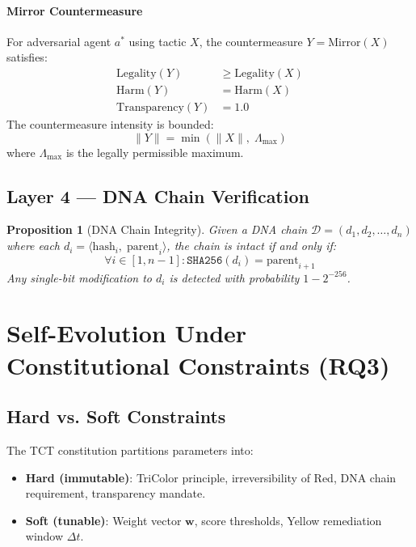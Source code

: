 \documentclass[conference]{IEEEtran}
\newtheorem{proposition}{Proposition}
\begin{document}
\paragraph{Mirror Countermeasure}
For adversarial agent $a^*$ using tactic $X$, the countermeasure
$Y = \text{Mirror}(X)$ satisfies:
\begin{align}
  \text{Legality}(Y) &\geq \text{Legality}(X) \label{eq:mirror_legal}\\
  \text{Harm}(Y) &= \text{Harm}(X) \label{eq:mirror_harm}\\
  \text{Transparency}(Y) &= 1.0 \label{eq:mirror_transparent}
\end{align}
The countermeasure intensity is bounded:
\begin{equation}
  \|Y\| = \min\!\left(\|X\|,\; \Lambda_{\max}\right)
  \label{eq:mirror_bound}
\end{equation}
where $\Lambda_{\max}$ is the legally permissible maximum.

\subsection{Layer 4 — DNA Chain Verification}

\begin{proposition}[DNA Chain Integrity]
Given a DNA chain $\mathcal{D} = (d_1, d_2, \ldots, d_n)$ where
each $d_i = \langle \text{hash}_i,\; \text{parent}_i \rangle$, the
chain is \emph{intact} if and only if:
\begin{equation}
  \forall i \in [1,n{-}1]: \texttt{SHA256}(d_i) = \text{parent}_{i+1}
\end{equation}
Any single-bit modification to $d_i$ is detected with probability
$1 - 2^{-256}$.
\end{proposition}

\section{Self-Evolution Under Constitutional Constraints (RQ3)}
\label{sec:evolution}

\subsection{Hard vs. Soft Constraints}

The TCT constitution partitions parameters into:
\begin{itemize}
  \item \textbf{Hard (immutable)}: TriColor principle, irreversibility
  of Red, DNA chain requirement, transparency mandate.
  \item \textbf{Soft (tunable)}: Weight vector $\mathbf{w}$, score
  thresholds, Yellow remediation window $\Delta t$.
\end{itemize}
\end{document}
